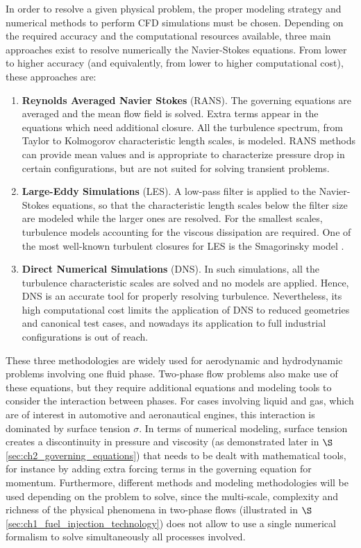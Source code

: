 In order to resolve a given physical problem, the proper modeling strategy and numerical methods to perform CFD simulations must be chosen. Depending on the required accuracy and the computational resources available, three main approaches exist to resolve numerically the Navier-Stokes equations. From lower to higher accuracy (and equivalently, from lower to higher computational cost), these approaches are:

\begin{enumerate}

	\item \textbf{Reynolds Averaged Navier Stokes} (RANS). The governing equations are averaged and the mean flow field is solved. Extra terms appear in the equations which need additional closure. All the turbulence spectrum, from Taylor to Kolmogorov characteristic length scales, is modeled. RANS methods can provide mean values and is appropriate to characterize pressure drop in certain configurations, but are not suited for solving transient problems.
	
	\item \textbf{Large-Eddy Simulations} (LES). A low-pass filter is applied to the Navier-Stokes equations, so that the characteristic length scales below the filter size are modeled while the larger ones are resolved. For the smallest scales, turbulence models accounting for the viscous dissipation are required. One of the most well-known turbulent closures for LES is the Smagorinsky model .
	
	\item \textbf{Direct Numerical Simulations} (DNS). In such simulations, all the turbulence characteristic scales are solved and no models are applied. Hence, DNS is an accurate tool for properly resolving turbulence. Nevertheless, its high computational cost limits the application of DNS to reduced geometries and canonical test cases, and nowadays its application to full industrial configurations is out of reach.

\end{enumerate}

These three methodologies are widely used for aerodynamic and hydrodynamic problems involving one fluid phase. Two-phase flow problems also make use of these equations, but they require additional equations and modeling tools to consider the interaction between phases. For cases involving liquid and gas, which are of interest in automotive and aeronautical engines, this interaction is dominated by surface tension $\sigma$. In terms of numerical modeling, surface tension creates a discontinuity in pressure and viscosity (as demonstrated later in $\S$\ref{sec:ch2_governing_equations}) that needs to be dealt with mathematical tools, for instance by adding extra forcing terms in the governing equation for momentum. Furthermore, different methods and modeling methodologies will be used depending on the problem to solve, since the multi-scale, complexity and richness of the physical phenomena in two-phase flows (illustrated in $\S$\ref{sec:ch1_fuel_injection_technology}) does not allow to use a single numerical formalism to solve simultaneously all processes involved.

